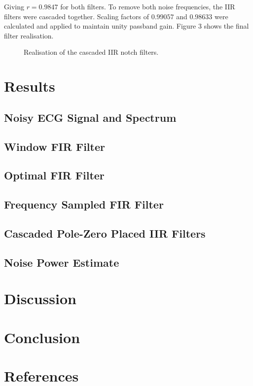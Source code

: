 \documentclass[12pt]{article}
\begin{document}
\noindent Giving $r = 0.9847$ for both filters. To remove both noise frequencies, the IIR filters were cascaded together. Scaling factors of $0.99057$ and $0.98633$ were calculated and applied to
maintain unity passband gain. Figure 3 shows the final filter realisation.

\begin{figure}[H]
    \centering
    
    \caption{Realisation of the cascaded IIR notch filters.}
    \label{fig:iir-filt}
\end{figure}
\section{Results}

\subsection{Noisy ECG Signal and Spectrum}

\subsection{Window FIR Filter}

\subsection{Optimal FIR Filter}

\subsection{Frequency Sampled FIR Filter}

\subsection{Cascaded Pole-Zero Placed IIR Filters}

\subsection{Noise Power Estimate}

\section{Discussion}

\section{Conclusion}

\section*{References}
\end{document}
